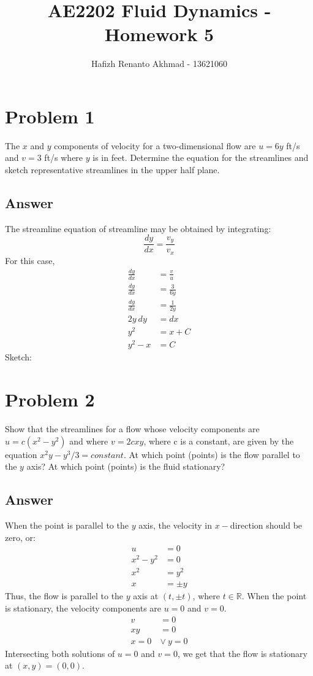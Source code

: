 \documentclass{article}
\title{AE2202 Fluid Dynamics - Homework 5}
\author{Hafizh Renanto Akhmad - 13621060}
\begin{document}
\maketitle

\newpage

\section*{Problem 1}
The $x$ and $y$ components of velocity for a two-dimensional flow are $u = 6y$ ft/s and $v = 3$ ft/s where $y$ is in feet. Determine the equation for the streamlines and sketch representative streamlines in the upper half plane.

\subsection*{Answer}
The streamline equation of streamline may be obtained by integrating:
\begin{equation}
    \frac{dy}{dx} = \frac{v_y}{v_x}
\end{equation}
For this case,
\begin{align*}
    \frac{dy}{dx} &= \frac{v}{u} \\
    \frac{dy}{dx} &= \frac{3}{6y} \\
    \frac{dy}{dx} &= \frac{1}{2y} \\
    2y\ dy &= dx \\
    y^2 &= x + C \\
    y^2 - x &= C
\end{align*}
Sketch:

\newpage

\section*{Problem 2}
Show that the streamlines for a flow whose velocity components are $u = c(x^2 - y^2)$ and where $v = 2cxy$, where c is a constant, are given by the equation $x^2 y - y^3 / 3 = constant$. At which point (points) is the flow parallel to the $y$ axis? At which point (points) is the fluid stationary?

\subsection*{Answer}
When the point is parallel to the $y$ axis, the velocity in $x-$direction should be zero, or:
\begin{align*}
    u &= 0 \\
    x^2 - y^2 &= 0 \\
    x^2 &= y^2 \\
    x &= \pm y
\end{align*}
Thus, the flow is parallel to the $y$ axis at $(t, \pm t)$, where $t \in \mathbb{R}$.
When the point is stationary, the velocity components are $u = 0$ and $v = 0$. 
\begin{align*}
    v &= 0 \\
    xy &= 0 \\
    x = 0\ &\vee\ y = 0
\end{align*}
Intersecting both solutions of $u = 0$ and $v = 0$, we get that the flow is stationary at $(x, y) = (0, 0)$.
\end{document}
